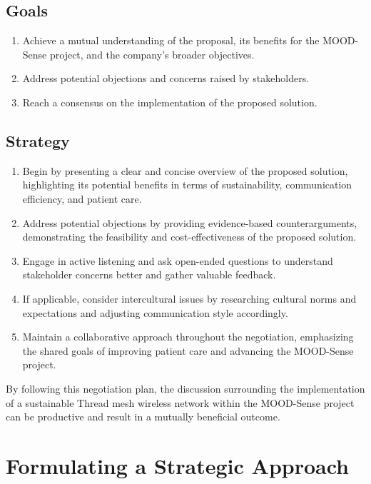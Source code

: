 \subsection*{Goals}

\begin{enumerate}
    \item Achieve a mutual understanding of the proposal, its benefits for the MOOD-Sense project, and the company's broader objectives.
    \item Address potential objections and concerns raised by stakeholders.
    \item Reach a consensus on the implementation of the proposed solution.
\end{enumerate}

\subsection*{Strategy}

\begin{enumerate}
    \item Begin by presenting a clear and concise overview of the proposed solution, highlighting its potential benefits in terms of sustainability, communication efficiency, and patient care.
    \item Address potential objections by providing evidence-based counterarguments, demonstrating the feasibility and cost-effectiveness of the proposed solution.
    \item Engage in active listening and ask open-ended questions to understand stakeholder concerns better and gather valuable feedback.
    \item If applicable, consider intercultural issues by researching cultural norms and expectations and adjusting communication style accordingly.
    \item Maintain a collaborative approach throughout the negotiation, emphasizing the shared goals of improving patient care and advancing the MOOD-Sense project.
\end{enumerate}

By following this negotiation plan, the discussion surrounding the implementation of a sustainable Thread mesh wireless network within the MOOD-Sense project can be productive and result in a mutually beneficial outcome.


\section{Formulating a Strategic Approach}

